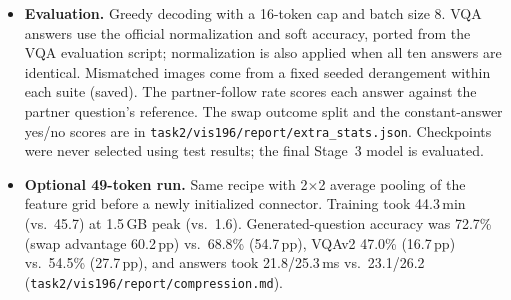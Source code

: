 \documentclass{article}
\newcommand{\pp}{\,pp}
\begin{document}
\begin{itemize}
\item \textbf{Evaluation.} Greedy decoding with a 16-token cap and batch size 8. VQA answers use the official normalization and soft accuracy, ported from the VQA evaluation script; normalization is also applied when all ten answers are identical. Mismatched images come from a fixed seeded derangement within each suite (saved). The partner-follow rate scores each answer against the partner question's reference. The swap outcome split and the constant-answer yes/no scores are in \texttt{task2/vis196/report/extra\_stats.json}. Checkpoints were never selected using test results; the final Stage~3 model is evaluated.
\item \textbf{Optional 49-token run.} Same recipe with 2$\times$2 average pooling of the feature grid before a newly initialized connector. Training took 44.3\,min (vs.\ 45.7) at 1.5\,GB peak (vs.\ 1.6). Generated-question accuracy was 72.7\% (swap advantage 60.2\pp) vs.\ 68.8\% (54.7\pp), VQAv2 47.0\% (16.7\pp) vs.\ 54.5\% (27.7\pp), and answers took 21.8/25.3\,ms vs.\ 23.1/26.2 (\texttt{task2/vis196/report/compression.md}).
\end{itemize}
\end{document}
